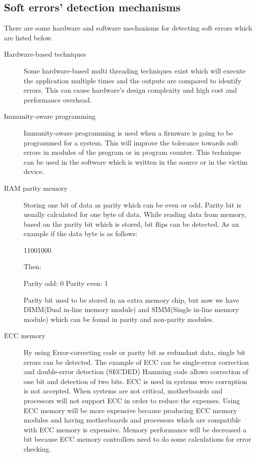 \documentclass[12pt]{report}
\begin{document}
\subsection{Soft errors' detection mechanisms}

There are some hardware and software mechanisms for detecting soft errors which are listed below.
\begin{description}

\item[Hardware-based techniques] Some hardware-based multi threading techniques \cite{reinhardt,mukherjee,vijaykumar} exist which will execute the application multiple times and the outputs are compared to identify errors. This can cause hardware's design complexity and high cost and performance overhead. \cite{soft} 

\item [Immunity-aware programming] Immunity-aware programming is used when a firmware is going to be programmed for a system. This will improve the tolerance towards soft errors in modules of the program or in program counter. This technique can be used in the software which is written in the source or in the victim device. \cite{immune}

\item [RAM parity memory]  Storing one bit of data as parity which can be even or odd. Parity bit is usually calculated for one byte of data. While reading data from memory, based on the parity bit which is stored, bit flips can be detected. As an example if the data byte is as follows:

11001000

Then:

Parity odd:  0
Parity even: 1

Parity bit used to be stored in an extra memory chip, but now we have DIMM(Dual in-line memory module) and SIMM(Single in-line memory module) which can be found in parity and non-parity modules.\cite{ramparity}

\item [ECC memory] By using Error-correcting code or parity bit as redundant data, single bit errors can be detected. The example of ECC can be single-error correction and double-error detection (SECDED) Hamming code allows correction of one bit and detection of two bits. ECC is used in systems were corruption is not accepted. When systems are not critical, motherboards and processors will not support ECC in order to reduce the expenses. Using ECC memory will be more expensive because producing ECC memory modules and having motherboards and processors which are compatible with ECC memory is expensive. Memory performance will be decreased a bit because ECC memory controllers need to do some calculations for error checking. \cite{eccmemory}

\end{description}
\end{document}
